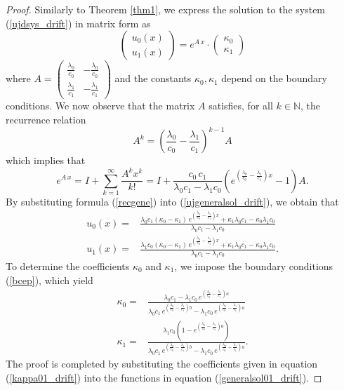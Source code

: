 \documentclass{article}
\begin{document}
\begin{proof} Similarly to Theorem \ref{thm1}, we express the solution to the system (\ref{ujdsys_drift}) in matrix form as
\begin{equation}\begin{pmatrix}u_0(x)\\u_1(x)\end{pmatrix}=e^{A\,x}\cdot\begin{pmatrix}\kappa_0\\\kappa_1\end{pmatrix}\label{ujgeneralsol_drift}\end{equation} where
$A=\begin{pmatrix}\frac{\lambda_0}{c_0} & -\frac{\lambda_0}{c_0}\\[0.5em]\frac{\lambda_1}{c_1} & -\frac{\lambda_1}{c_1}\end{pmatrix}$
and the constants $\kappa_0,\kappa_1$ depend on the boundary conditions. We now observe that the matrix $A$ satisfies, for all $k\in\mathbb{N}$, the recurrence relation
$$A^k=\left(\frac{\lambda_0}{c_0}-\frac{\lambda_1}{c_1}\right)^{k-1}A$$ which implies that
\begin{equation}e^{A\, x}=I+\sum_{k=1}^\infty\frac{A^k x^k}{k!}=I+\frac{c_0\,c_1}{\lambda_0 c_1-\lambda_1c_0}\left(e^{\left(\frac{\lambda_0}{c_0}-\frac{\lambda_1}{c_1}\right)x}-1\right)A.\label{recgene}\end{equation} By substituting formula (\ref{recgene}) into (\ref{ujgeneralsol_drift}), we obtain that
\begin{equation}\label{generalsol01_drift}
\begin{aligned}
u_0(x)=&\frac{\lambda_0c_1(\kappa_0-\kappa_1)\,e^{\left(\frac{\lambda_0}{c_0}-\frac{\lambda_1}{c_1}\right)x}+\kappa_1\lambda_0c_1-\kappa_0\lambda_1c_0}{\lambda_0c_1-\lambda_1c_0}\\
u_1(x)=&\frac{\lambda_1c_0(\kappa_0-\kappa_1)\,e^{\left(\frac{\lambda_0}{c_0}-\frac{\lambda_1}{c_1}\right)x}+\kappa_1\lambda_0c_1-\kappa_0\lambda_1c_0}{\lambda_0c_1-\lambda_1c_0}.
\end{aligned}
\end{equation}
To determine the coefficients $\kappa_0$ and $\kappa_1$, we impose the boundary conditions (\ref{bcep}), which yield
\begin{equation}\label{kappa01_drift}
\begin{aligned}
\kappa_0=&\frac{\lambda_0c_1-\lambda_1c_0\,e^{\left(\frac{\lambda_0}{c_0}-\frac{\lambda_1}{c_1}\right)a}}{\lambda_0c_1\,e^{\left(\frac{\lambda_0}{c_0}-\frac{\lambda_1}{c_1}\right)b}-\lambda_1c_0\,e^{\left(\frac{\lambda_0}{c_0}-\frac{\lambda_1}{c_1}\right)a}}\\[0.5em]
\kappa_1=&\frac{\lambda_1c_0\left(1-e^{\left(\frac{\lambda_0}{c_0}-\frac{\lambda_1}{c_1}\right)a}\right)}{\lambda_0c_1\,e^{\left(\frac{\lambda_0}{c_0}-\frac{\lambda_1}{c_1}\right)b}-\lambda_1c_0\,e^{\left(\frac{\lambda_0}{c_0}-\frac{\lambda_1}{c_1}\right)a}}.
\end{aligned}
\end{equation}
The proof is completed by substituting the coefficients given in equation (\ref{kappa01_drift}) into the functions in equation (\ref{generalsol01_drift}). 
\end{proof}
\end{document}

